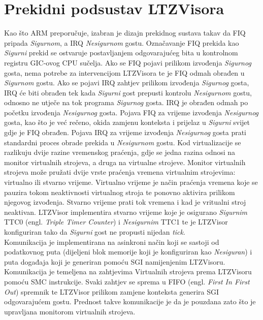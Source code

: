 \documentclass[times, utf8, diplomski, numeric]{fer}
\begin{document}
\section{Prekidni podsustav LTZVisora}
Kao što ARM preporučuje, izabran je dizajn prekidnog sustava takav da FIQ pripada \textit{Sigurnom}, a IRQ \textit{Nesigurnom} gostu. Označavanje
FIQ prekida kao \textit{Sigurni} prekid se ostvaruje postavljanjem odgovarajućeg bita u kontrolnom registru GIC-ovog CPU sučelja.
Ako se FIQ pojavi prilikom izvođenja \textit{Sigurnog} gosta, nema potrebe za intervencijom LTZVisora te je FIQ odmah obrađen u
\textit{Sigurnom} gostu. Ako se pojavi IRQ zahtjev prilikom izvođenja \textit{Sigurnog} gosta, IRQ će biti obrađen tek kada \textit{Sigurni} gost prepusti
kontrolu \textit{Nesigurnom} gostu, odnosno ne utječe na tok programa \textit{Sigurnog} gosta. IRQ je obrađen odmah po početku izvođenja
\textit{Nesigurnog} gosta. Pojava FIQ za vrijeme izvođenja \textit{Nesigurnog} gosta, kao što je već rečeno, okida zamjenu konteksta i prijelaz
u \textit{Sigurni} svijet gdje je FIQ obrađen. Pojava IRQ za vrijeme izvođenja \textit{Nesigurnog} gosta prati standardni proces obrade prekida
u \textit{Nesigurnom} gostu. Kod virtualizacije se razlikuju dvije razine vremenskog praćenja, gdje se jedna razina odnosi na monitor
virtualnih strojeva, a druga na virtualne strojeve. Monitor virtualnih strojeva može pružati dvije vrste praćenja vremena
virtualnim strojevima: virtualno ili stvarno vrijeme. Virtualno vrijeme je način praćenja vremena koje se pauzira tokom
neaktivnosti virtualnog stroja te ponovno aktivira prilikom njegovog izvođenja. Stvarno vrijeme prati tok vremena i kad je
vritualni stroj neaktivan. LTZVisor implementira stvarno vrijeme koje je osigurano \textit{Sigurnim} TTC0 (engl. \textit{Triple Timer
Counter}) i \textit{Nesigurnim} TTC1 te je LTZVisor konfiguriran tako da \textit{Sigurni} gost ne propusti nijedan \textit{tick}.\\
Komunikacija je implementirana na asinkroni način koji se sastoji od podatkovnog puta (dijeljeni blok memorije koji je
konfiguriran kao \textit{Nesiguran}) i puta događaja koji je generiran pomoću SGI namijenjenim LTZVisoru. Komunikacija je temeljena
na zahtjevima Virtualnih strojeva prema LTZVisoru pomoću SMC instrukcije. Svaki zahtjev se sprema u FIFO (engl. \textit{First
In First Out}) spremnik te LTZVisor prilikom zamjene konteksta generira SGI odgovarajućem gostu. Prednost takve komunikacije
je da je pouzdana zato što je upravljana monitorom virtualnih strojeva.
\end{document}
